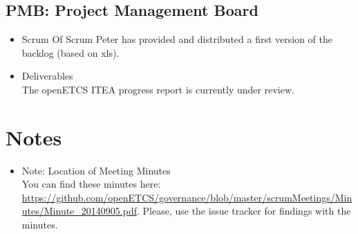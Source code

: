 \documentclass[a4paper, 11pt]{article}
\begin{document}
\subsection{PMB: Project Management Board}
\begin{itemize}
\item Scrum Of Scrum
Peter has provided and distributed a first version of the backlog (based on xls). \\
\item Deliverables\\
The openETCS ITEA progress report is currently under review.

\end{itemize}

\section{Notes}
\begin{itemize}

\item Note: Location of Meeting Minutes\\
You can find these minutes here: \url{https://github.com/openETCS/governance/blob/master/scrumMeetings/Minutes/Minute_20140905.pdf}. Please, use the issue tracker for findings with the minutes.

\end{itemize}
\end{document}
